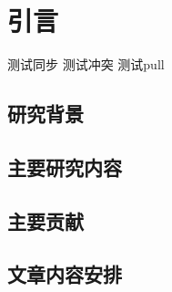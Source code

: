 \chapter{引言}
\label{cha:intro}
测试同步
测试冲突
测试pull


\section{研究背景}
\label{sec:background}

\section{主要研究内容}
\label{sec:work}

\section{主要贡献}
\label{sec:contribution}

\section{文章内容安排}
\label{sec:contribution}

